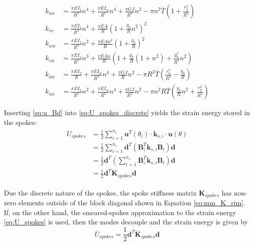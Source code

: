 \documentclass[\rootdir/thesis.tex]{subfiles}
\begin{document}
\begin{align*}
k_{uu} &= \frac{\pi EI_2}{R^3}n^4 + \frac{\pi EI_w}{R^5}n^4 + \frac{\pi GJ}{R^3}n^2 - \pi n^2 \bar{T}\left(1 + \frac{r_y^2}{R^2}\right)\\
k_{vv} &= \frac{\pi EI_1}{R^3}n^4 + \frac{\pi EA}{R}\left(1 + \frac{y_0}{R}n^2 \right)^2\\
k_{ww} &= \frac{\pi EI_1}{R^3}n^2 + \frac{\pi EA n^2}{R}\left(1 + \frac{y_0}{R} \right)^2\\
k_{vw} &= \frac{\pi EI_1}{R^3}n^3 + \frac{\pi EA n}{R}\left(1 + \frac{y_0}{R}(1+n^2) + \frac{y_0^2}{R^2}n^2\right)\\
k_{\phi\phi} &= \frac{\pi EI_2}{R} + \frac{\pi EI_w}{R^3}n^4 + \frac{\pi GJ}{R}n^2 - \pi R^2\bar{T}\left(\frac{r_0^2}{R^2}-\frac{y_0}{R}\right)\\
k_{u\phi} &= \frac{\pi EI_2}{R^2}n^2 + \frac{\pi EI_w}{R^4}n^4 + \frac{\pi GJ}{R^2}n^2 - \pi n^2 R \bar{T}\left(\frac{y_0}{R}n^2 + \frac{r_y^2}{R^2}\right)
\end{align*}

Inserting \eqref{eq:u_Bd} into \eqref{eq:U_spokes_discrete} yields the strain energy stored in the spokes:
\begin{align}
\label{eq:mm_U_spokes}
\begin{split}
U_{spokes} &= \frac{1}{2} \sum_{i=1}^{n_s} \mathbf{u}^T(\theta_i) \cdot \mathbf{k}_{s,i} \cdot \mathbf{u}(\theta)\\
&= \frac{1}{2} \sum_{i=1}^{n_s} \mathbf{d}^T \left(\mathbf{B}_i^T\mathbf{k}_{s, i}\mathbf{B}_i \right)\mathbf{d}\\
&= \frac{1}{2} \mathbf{d}^T \left(\sum_{i=1}^{n_s} \mathbf{B}_i^T\mathbf{k}_{s, i}\mathbf{B}_i \right) \mathbf{d}\\
&= \frac{1}{2} \mathbf{d}^T \mathbf{K}_{spokes} \mathbf{d}
\end{split}
\end{align}

Due the discrete nature of the spokes, the spoke stiffness matrix $\mathbf{K}_{spokes}$ has non-zero elements outside of the block diagonal shown in Equation \eqref{eq:mm_K_rim}. If, on the other hand, the smeared-spokes approximation to the strain energy \eqref{eq:U_spokes} is used, then the modes decouple and the strain energy is given by
\begin{equation}
\label{eq:U_spokes_smeared}
\bar{U}_{spokes} = \frac{1}{2} \mathbf{d}^T \bar{\mathbf{K}}_{spokes} \mathbf{d}
\end{equation}
\end{document}
